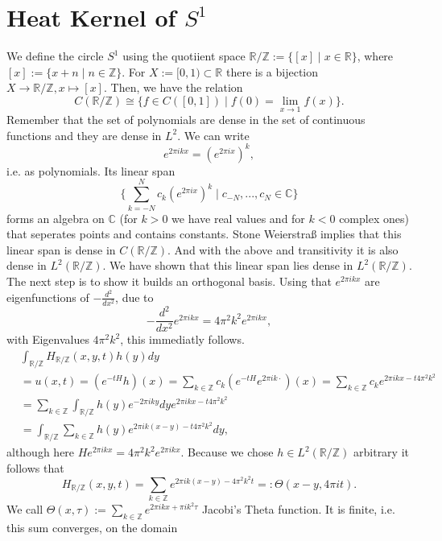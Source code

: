 \documentclass[A4,12pt,twoside]{book}
\begin{document}
\section{Heat Kernel of $S^1$}
We define the circle $S^1$ using the quotiient space $\mathbb{R}/ \mathbb{Z} := \{ [x] \mid x \in \mathbb{R} \}$, where $[x] := \{ x +n \mid n \in \mathbb{Z} \}$. For $X := [0,1) \subset \mathbb{R}$ there is a bijection $X \to \mathbb{R}/\mathbb{Z}, x \mapsto [x]$. Then, we have the relation  
\[
C(\mathbb{R}/\mathbb{Z}) \cong \{ f \in C([0,1]) \mid f(0) = \lim_{x \to 1} f(x) \}.
\]
Remember that the set of polynomials are dense in the set of continuous functions and they are dense in $L^2$. We can write 
\[
e^{2 \pi i k x} = \left( e^{2 \pi i x} \right)^k,
\]
i.e. as polynomials. Its linear span 
\[
\{ \sum_{k=-N}^N c_k \left( e^{2 \pi i x} \right)^k \mid c_{-N},...,c_N \in \mathbb{C} \}
\] 
forms an algebra on $\mathbb{C}$ (for $k>0$ we have real values and for $k<0$ complex ones) that seperates points and contains constants. Stone Weierstraß implies that this linear span is dense in $C(\mathbb{R} / \mathbb{Z})$. And with the above and transitivity it is also dense in $L^2 (\mathbb{R}/ \mathbb{Z})$. We have shown that this linear span lies dense in $L^2( \mathbb{R}/\mathbb{Z})$. The next step is to show it builds an orthogonal basis. Using that $e^{2 \pi i k x} $ are eigenfunctions of $-\frac{d^2}{dx^2}$, due to 
\[
-\frac{d^2}{dx^2} e^{2 \pi i k x} = 4 \pi^2 k^2 e^{2 \pi i k x},
\]
with Eigenvalues $4 \pi^2 k^2 $, this immediatly follows. 
\begin{align*}
    &\int_{\mathbb{R} / \mathbb{Z}} H_{\mathbb{R} / \mathbb{Z}} (x,y,t) h(y) d y \\
    &=u(x,t) = \left( e^{-tH} h \right) (x) = \sum_{k \in \mathbb{Z}} c_k \left( e^{-tH} e^{2 \pi ik \cdot} \right)(x) = \sum_{k \in \mathbb{Z}} c_k e^{2 \pi i k x - t 4 \pi^2 k^2 } \\
    &= \sum_{k \in \mathbb{Z}} \int_{\mathbb{R} / \mathbb{Z}} h(y) e^{- 2 \pi i k y} d y e^{2 \pi i k x - t 4 \pi^2 k^2 }  \\
    &= \int_{\mathbb{R} / \mathbb{Z}} \sum_{k \in \mathbb{Z}}  h(y) e^{2 \pi i k (x-y) - t 4 \pi^2 k^2 } d y ,
\end{align*}
although here $H e^{2 \pi i k x} = 4 \pi^2 k^2 e^{2 \pi i k x}$. Because we chose $h \in L^2 (\mathbb{R}/ \mathbb{Z})$ arbitrary it follows that 
\[
H_{\mathbb{R} / \mathbb{Z}} (x,y,t) = \sum_{ k \in \mathbb{Z}} e^{2 \pi i k (x-y) - 4 \pi^2 k^2 t} =: \Theta (x-y, 4 \pi i t).
\]
We call $\Theta (x, \tau) := \sum_{k \in \mathbb{Z}} e^{2 \pi i k x + \pi i k^2 \tau}$ Jacobi's Theta function. It is finite, i.e. this sum converges, on the domain 
\end{document}
